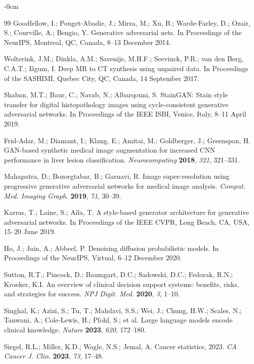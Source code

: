 \documentclass[ai,article,submit,pdftex,moreauthors]{Definitions/mdpi}
\begin{document}
\begin{adjustwidth}{-\extralength}{0cm}
\begin{thebibliography}{99}
Goodfellow, I.; Pouget-Abadie, J.; Mirza, M.; Xu, B.; Warde-Farley, D.; Ozair, S.; Courville, A.; Bengio, Y. Generative adversarial nets. In Proceedings of the NeurIPS, Montreal, QC, Canada, 8--13 December 2014.

Wolterink, J.M.; Dinkla, A.M.; Savenije, M.H.F.; Seevinck, P.R.; van den Berg, C.A.T.; I\v{s}gum, I. Deep MR to CT synthesis using unpaired data. In Proceedings of the SASHIMI, Quebec City, QC, Canada, 14 September 2017.

Shaban, M.T.; Baur, C.; Navab, N.; Albarqouni, S. StainGAN: Stain style transfer for digital histopathology images using cycle-consistent generative adversarial networks. In Proceedings of the IEEE ISBI, Venice, Italy, 8--11 April 2019.

Frid-Adar, M.; Diamant, I.; Klang, E.; Amitai, M.; Goldberger, J.; Greenspan, H. GAN-based synthetic medical image augmentation for increased CNN performance in liver lesion classification. \textit{Neurocomputing} \textbf{2018}, \textit{321}, 321--331.

Mahapatra, D.; Bozorgtabar, B.; Garnavi, R. Image super-resolution using progressive generative adversarial networks for medical image analysis. \textit{Comput. Med. Imaging Graph.} \textbf{2019}, \textit{71}, 30--39.

Karras, T.; Laine, S.; Aila, T. A style-based generator architecture for generative adversarial networks. In Proceedings of the IEEE CVPR, Long Beach, CA, USA, 15--20 June 2019.

Ho, J.; Jain, A.; Abbeel, P. Denoising diffusion probabilistic models. In Proceedings of the NeurIPS, Virtual, 6--12 December 2020.

Sutton, R.T.; Pincock, D.; Baumgart, D.C.; Sadowski, D.C.; Fedorak, R.N.; Kroeker, K.I. An overview of clinical decision support systems: benefits, risks, and strategies for success. \textit{NPJ Digit. Med.} \textbf{2020}, \textit{3}, 1--10.

Singhal, K.; Azizi, S.; Tu, T.; Mahdavi, S.S.; Wei, J.; Chung, H.W.; Scales, N.; Tanwani, A.; Cole-Lewis, H.; Pfohl, S.; et al. Large language models encode clinical knowledge. \textit{Nature} \textbf{2023}, \textit{620}, 172--180.

Siegel, R.L.; Miller, K.D.; Wagle, N.S.; Jemal, A. Cancer statistics, 2023. \textit{CA Cancer J. Clin.} \textbf{2023}, \textit{73}, 17--48.


\end{thebibliography}
\end{adjustwidth}
\end{document}
